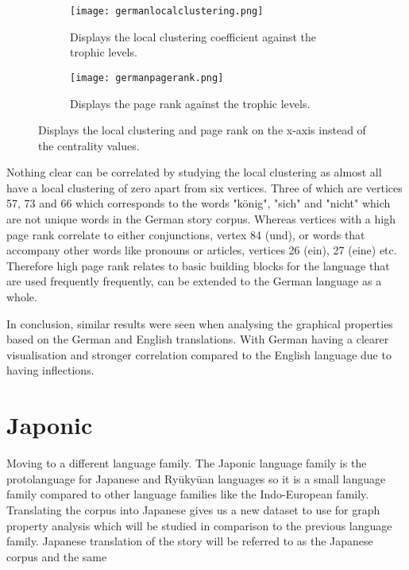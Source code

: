 \begin{figure}[H]
\centering
\begin{subfigure}{.45\textwidth}
	\hspace{-1cm} 
	\texttt{[image: germanlocalclustering.png]}
	\caption{Displays the local clustering coefficient against the trophic levels.}
	\label{fig:gerlc}
\end{subfigure}
\hfill
\begin{subfigure}{.45\textwidth}
	\hspace{-1cm} 
	\texttt{[image: germanpagerank.png]}
	\caption{Displays the page rank against the trophic levels.}
	\label{fig:gerpr}
\end{subfigure}
\caption{Displays the local clustering and page rank on the x-axis instead of the centrality values.}
\label{fig:gerother}
\end{figure}

Nothing clear can be correlated by studying the local clustering as almost all have a local clustering of zero apart from six vertices. Three of which are vertices 57, 73 and 66 which corresponds to the words "könig", "sich" and "nicht" which are not unique words in the German story corpus. Whereas vertices with a high page rank correlate to either conjunctions, vertex 84 (und), or words that accompany other words like pronouns or articles, vertices 26 (ein), 27 (eine) etc. Therefore high page rank relates to basic building blocks for the language that are used frequently frequently, can be extended to the German language as a whole.

In conclusion, similar results were seen when analysing the graphical properties based on the German and English translations. With German having a clearer visualisation and stronger correlation compared to the English language due to having inflections.


\section{Japonic}
Moving to a different language family. The Japonic language family is the protolanguage for Japanese and Ryūkyūan languages\cite{vovin2017origins} so it is a small language family compared to other language families like the Indo-European family. Translating the corpus into Japanese gives us a new dataset to use for graph property analysis which will be studied in comparison to the previous language family. Japanese translation of the story will be referred to as the Japanese corpus and the same 
